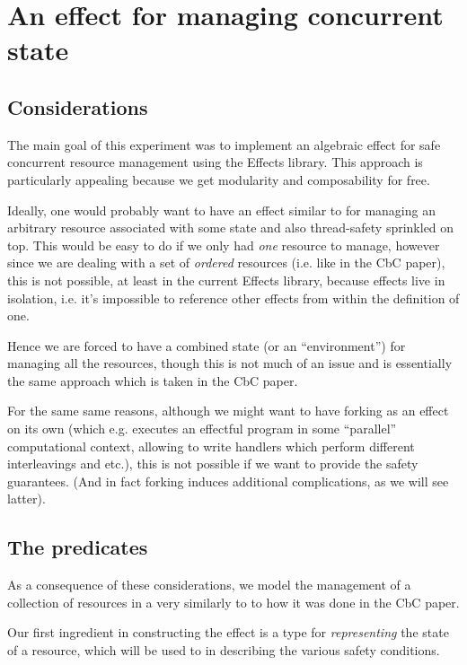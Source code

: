 \section{An effect for managing concurrent state}

\subsection{Considerations}

The main goal of this experiment was to implement an algebraic effect for safe
concurrent resource management using the Effects library. This approach is
particularly appealing because we get modularity and composability for free.

Ideally, one would probably want to have an effect similar to 
for managing an arbitrary resource associated with some state and also
thread-safety sprinkled on top. This would be easy to do if we only had
\emph{one} resource to manage, however since we are dealing with a set of
\emph{ordered} resources (i.e. like in the CbC paper), this is not possible, at
least in the current Effects library, because effects live in isolation, i.e.
it's impossible to reference other effects from within the definition of one.

Hence we are forced to have a combined state (or an ``environment'') for managing
all the resources, though this is not much of an issue and is essentially the
same approach which is taken in the CbC paper.

For the same same reasons, although we might want to have forking as an
effect on its own (which e.g. executes an effectful program in some ``parallel''
computational context, allowing to write handlers which perform different
interleavings and etc.), this is not possible if we want to provide the safety
guarantees. (And in fact forking induces additional complications, as we will
see latter).

\subsection{The predicates}

As a consequence of these considerations, we model the management of a collection
of resources in a very similarly to to how it was done in the CbC paper.

Our first ingredient in constructing the effect is a type for
\emph{representing} the state of a resource, which will be used to in
describing the various safety conditions.


